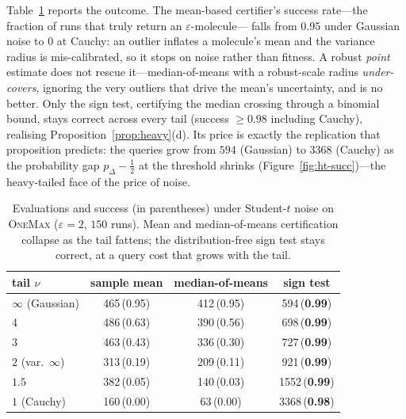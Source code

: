 \documentclass[11pt,a4paper]{article}
\begin{document}
Table~\ref{tab:ht} reports the outcome.  The mean-based certifier's success
rate---the fraction of runs that truly return an $\varepsilon$-molecule---
falls from $0.95$ under Gaussian noise to $0$ at Cauchy: an outlier inflates
a molecule's mean and the variance radius is mis-calibrated, so it stops on
noise rather than fitness.  A robust \emph{point} estimate does not rescue
it---median-of-means with a robust-scale radius \emph{under-covers},
ignoring the very outliers that drive the mean's uncertainty, and is no
better.  Only the sign test, certifying the median crossing through a
binomial bound, stays correct across every tail (success $\ge0.98$ including
Cauchy), realising Proposition~\ref{prop:heavy}(d).  Its price is exactly the
replication that proposition predicts: the queries grow from $594$
(Gaussian) to $3368$ (Cauchy) as the probability gap $p_\Delta-\tfrac12$ at
the threshold shrinks (Figure~\ref{fig:ht-succ})---the heavy-tailed face of
the price of noise.

\begin{table}[ht]
\centering
\caption{Evaluations and success (in parentheses) under Student-$t$ noise
  on \textsc{OneMax} ($\varepsilon{=}2$, $150$ runs).  Mean and
  median-of-means certification collapse as the tail fattens; the
  distribution-free sign test stays correct, at a query cost that grows with
  the tail.}
\label{tab:ht}
\renewcommand{\arraystretch}{1.12}
\begin{tabular}{@{}lccc@{}}
\toprule
tail $\nu$ & sample mean & median-of-means & sign test \\
\midrule
$\infty$ (Gaussian) & 465\,(0.95) & 412\,(0.95) & 594\,(\textbf{0.99}) \\
$4$                 & 486\,(0.63) & 390\,(0.56) & 698\,(\textbf{0.99}) \\
$3$                 & 463\,(0.43) & 336\,(0.30) & 727\,(\textbf{0.99}) \\
$2$ (var.\ $\infty$)& 313\,(0.19) & 209\,(0.11) & 921\,(\textbf{0.99}) \\
$1.5$               & 382\,(0.05) & 140\,(0.03) & 1552\,(\textbf{0.99}) \\
$1$ (Cauchy)        & 160\,(0.00) & 63\,(0.00)  & 3368\,(\textbf{0.98}) \\
\bottomrule
\end{tabular}
\end{table}
\end{document}
